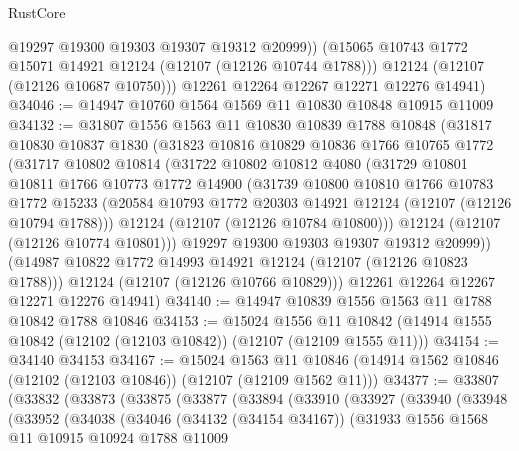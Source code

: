 \begin{lexlean}{RustCore}
\begin{coremodule}
            @19297
            @19300
            @19303
            @19307
            @19312
            @20999))
        (@15065 @10743 @1772 @15071 @14921 @12124 (@12107 (@12126 @10744 @1788)))
        @12124
        (@12107 (@12126 @10687 @10750)))
      @12261
      @12264
      @12267
      @12271
      @12276
      @14941)
@34046 := @14947 @10760 @1564 @1569 @11 @10830 @10848 @10915 @11009
@34132 := @31807
    @1556
    @1563
    @11
    @10830
    @10839
    @1788
    @10848
    (@31817
      @10830
      @10837
      @1830
      (@31823
        @10816
        @10829
        @10836
        @1766
        @10765
        @1772
        (@31717
          @10802
          @10814
          (@31722
            @10802
            @10812
            @4080
            (@31729
              @10801
              @10811
              @1766
              @10773
              @1772
              @14900
              (@31739
                @10800
                @10810
                @1766
                @10783
                @1772
                @15233
                (@20584 @10793 @1772 @20303 @14921 @12124 (@12107 (@12126 @10794 @1788)))
                @12124
                (@12107 (@12126 @10784 @10800)))
              @12124
              (@12107 (@12126 @10774 @10801)))
            @19297
            @19300
            @19303
            @19307
            @19312
            @20999))
        (@14987 @10822 @1772 @14993 @14921 @12124 (@12107 (@12126 @10823 @1788)))
        @12124
        (@12107 (@12126 @10766 @10829)))
      @12261
      @12264
      @12267
      @12271
      @12276
      @14941)
@34140 := @14947 @10839 @1556 @1563 @11 @1788 @10842 @1788 @10846
@34153 := @15024
    @1556
    @11
    @10842
    (@14914 @1555 @10842 (@12102 (@12103 @10842)) (@12107 (@12109 @1555 @11)))
@34154 := @34140 @34153
@34167 := @15024
    @1563
    @11
    @10846
    (@14914 @1562 @10846 (@12102 (@12103 @10846)) (@12107 (@12109 @1562 @11)))
@34377 := @33807
    (@33832
      (@33873
        (@33875
          (@33877
            (@33894
              (@33910
                (@33927
                  (@33940
                    (@33948
                      (@33952
                        (@34038
                          (@34046
                            (@34132 (@34154 @34167))
                            (@31933
                              @1556
                              @1568
                              @11
                              @10915
                              @10924
                              @1788
                              @11009

\end{coremodule}
\end{lexlean}
